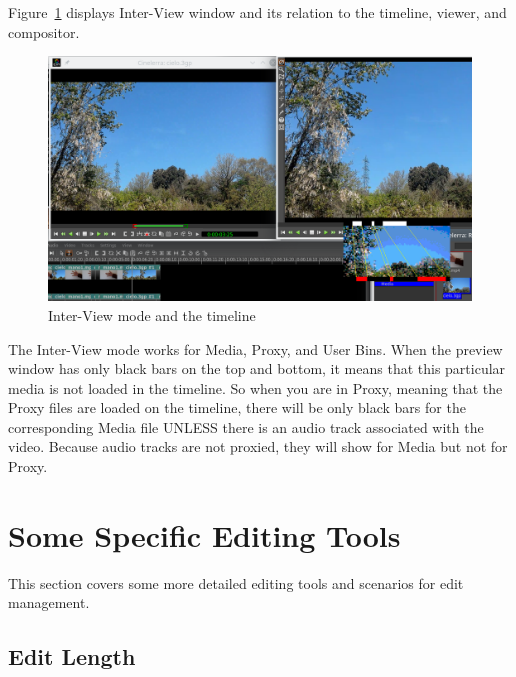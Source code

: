 Figure~\ref{fig:inter-view02} displays Inter-View window and its relation to the timeline, viewer, and compositor.
\begin{figure}[htpb]
    \centering
    \includegraphics[width=0.9\linewidth]{images/inter-view02.png}
    \caption{Inter-View mode and the timeline}
    \label{fig:inter-view02}
\end{figure}
The Inter-View mode works for Media, Proxy, and User Bins.  When the preview window has only black bars on the top and bottom, it means that this particular media is not loaded in the timeline.  So when you are in Proxy, meaning that the Proxy files are loaded on the timeline, there will be only black bars for the corresponding Media file UNLESS there is an audio track associated with the video.  Because audio tracks are not proxied, they will show for Media but not for Proxy.

\section{Some Specific Editing Tools}%
\label{sec:specific_editing_tools}

This section covers some more detailed editing tools and scenarios for edit management.

\subsection{Edit Length}%
\label{sub:edit-lenght}

